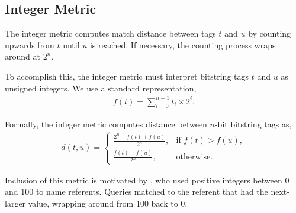 \subsection{Integer Metric} \label{sec:integer}

The integer metric computes match distance between tags $t$ and $u$ by counting upwards from $t$ until $u$ is reached.
If necessary, the counting process wraps around at $2^n$.

To accomplish this, the integer metric must interpret bitstring tags $t$ and $u$ as unsigned integers.
We use a standard representation,
\begin{align*}
f(t)
= \sum_{i=0}^{n-1} t_i \times 2^i.
\end{align*}

Formally, the integer metric computes distance between $n$-bit bitstring tags as,
\begin{align*}
d(t, u) =
\begin{cases}
  \frac{2^n - f(t) + f(u)}{2^n}, & \text{if } f(t) > f(u), \\
  \frac{f(t) - f(u)}{2^n},         & \text{otherwise}.
\end{cases}
\end{align*}

Inclusion of this metric is motivated by \cite{spector2011tag}, who used positive integers between 0 and 100 to name referents.
Queries matched to the referent that had the next-larger value, wrapping around from 100 back to 0.
